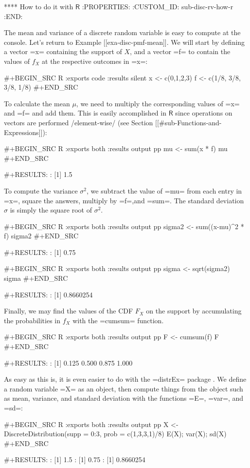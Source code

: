 **** How to do it with \(\mathsf{R}\)
:PROPERTIES:
:CUSTOM_ID: sub-disc-rv-how-r
:END:

The mean and variance of a discrete random variable is easy to compute
at the console. Let's return to Example [[exa-disc-pmf-mean]]. We will start
by defining a vector =x= containing the support of \(X\), and a vector
=f= to contain the values of \(f_{X}\) at the respective outcomes in
=x=:

#+BEGIN_SRC R :exports code :results silent
x <- c(0,1,2,3)
f <- c(1/8, 3/8, 3/8, 1/8)
#+END_SRC

To calculate the mean \(\mu\), we need to multiply the corresponding
values of =x= and =f= and add them. This is easily accomplished in
\(\mathsf{R}\) since operations on vectors are performed
/element-wise/ (see Section [[#sub-Functions-and-Expressions]]):

#+BEGIN_SRC R :exports both :results output pp  
mu <- sum(x * f)
mu
#+END_SRC

#+RESULTS:
: [1] 1.5

To compute the variance \(\sigma^{2}\), we subtract the value of =mu=
from each entry in =x=, square the answers, multiply by =f=,and
=sum=. The standard deviation \(\sigma\) is simply the square root of
\(\sigma^{2}\).

#+BEGIN_SRC R :exports both :results output pp  
sigma2 <- sum((x-mu)^2 * f)
sigma2
#+END_SRC

#+RESULTS:
: [1] 0.75

#+BEGIN_SRC R :exports both :results output pp  
sigma <- sqrt(sigma2)
sigma
#+END_SRC

#+RESULTS:
: [1] 0.8660254

Finally, we may find the values of the CDF \(F_{X}\) on the support by
accumulating the probabilities in \(f_{X}\) with the =cumsum=
function.

#+BEGIN_SRC R :exports both :results output pp  
F <- cumsum(f)
F
#+END_SRC

#+RESULTS:
: [1] 0.125 0.500 0.875 1.000

As easy as this is, it is even easier to do with the =distrEx= package
\cite{distrEx}. We define a random variable =X= as an object, then
compute things from the object such as mean, variance, and standard
deviation with the functions =E=, =var=, and =sd=:

#+BEGIN_SRC R :exports both :results output pp  
X <- DiscreteDistribution(supp = 0:3, prob = c(1,3,3,1)/8)
E(X); var(X); sd(X)
#+END_SRC

#+RESULTS:
: [1] 1.5
: [1] 0.75
: [1] 0.8660254

